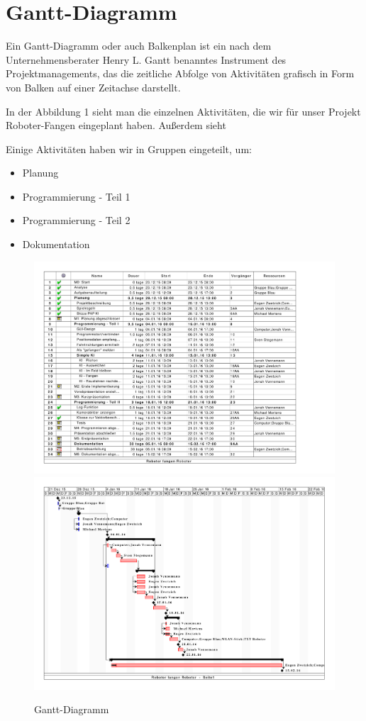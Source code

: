 \section{Gantt-Diagramm}
Ein Gantt-Diagramm oder auch Balkenplan ist ein nach dem Unternehmensberater Henry L. Gantt benanntes Instrument des Projektmanagements, das die zeitliche Abfolge von Aktivitäten grafisch in Form von Balken auf einer Zeitachse darstellt.

In der Abbildung 1 sieht man die einzelnen Aktivitäten, die wir für unser Projekt Roboter-Fangen eingeplant haben.
Außerdem sieht

Einige Aktivitäten haben wir in Gruppen eingeteilt, um:
\begin{itemize}
	\item Planung
	\item Programmierung - Teil 1
	\item Programmierung - Teil 2
	\item Dokumentation
\end{itemize}

\begin{center}
	\begin{figure}[H]
		\includegraphics[scale=0.5]{Bilder/GanttDiagramm_[Page1].pdf}
		\includegraphics[scale=0.5]{Bilder/GanttDiagramm_[Page2].pdf}
		\caption{Gantt-Diagramm}
	\end{figure}
\end{center}
